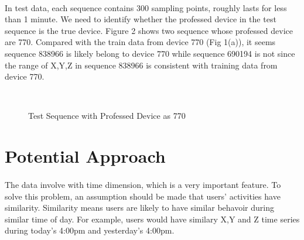 \documentclass{article}
\begin{document}
	\paragraph{}In test data, each sequence contains 300 sampling points, roughly lasts for less than 1 minute. We need to identify whether the professed device in the test sequence is the true device. Figure 2 shows two sequence whose professed device are 770. Compared with the train data from device 770 (Fig 1(a)), it seems sequence 838966 is likely belong to device 770 while sequence 690194 is not since the range of X,Y,Z in sequence 838966 is consistent with training data from device 770. 
	\begin{figure}
		\centering
		\\
		\caption{Test Sequence with Professed Device as 770}
	\end{figure}
	
	

	\section{Potential Approach} %
	\label{sec:potential_approach}
	\paragraph{}The data involve with time dimension, which is a very important feature. To solve this problem, an assumption should be made that users' activities have similarity. Similarity means users are likely to have similar behavoir during similar time of day. For example, users would have similary X,Y and Z time series during today's 4:00pm and yesterday's 4:00pm. 
\end{document}
